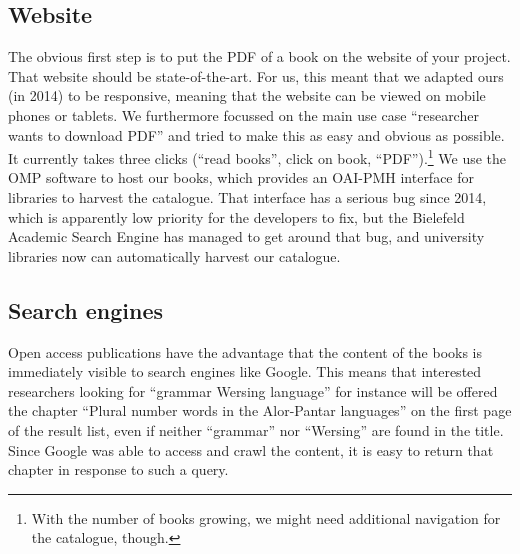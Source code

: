 \documentclass[guidelines,nonflat,modfonts] {langsci/langscibook}
\begin{document}
\subsection{Website}
The obvious first step is to put the PDF of a book on the website of your project. That website should be state-of-the-art. For us, this meant that we adapted ours (in 2014) to be responsive, meaning that the website can be viewed on mobile phones or tablets. We furthermore focussed on the main use case ``researcher wants to download PDF'' and tried to make this as easy and obvious as possible. It currently takes three clicks (``read books'', click on book, ``PDF'').\footnote{With the number of books growing, we might need additional navigation for the catalogue, though.} We use the OMP software to host our books, which provides an OAI-PMH interface for libraries to harvest the catalogue. That interface has a serious bug since 2014, which is apparently low priority for the developers to fix, but the Bielefeld Academic Search Engine has managed to get around that bug, and university libraries now can automatically harvest our catalogue.

\subsection{Search engines}
Open access publications have the advantage that the content of the books is immediately visible to search engines like Google. This means that interested researchers looking for ``grammar Wersing language'' for instance will be offered the chapter ``Plural number words in the Alor-Pantar languages'' on the first page of the result list, even if neither ``grammar'' nor ``Wersing'' are found in the title. Since Google was able to access and crawl the content, it is easy to return that chapter in response to such a query. 
\end{document}
